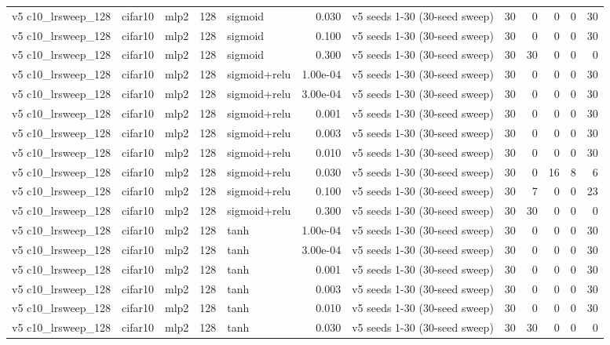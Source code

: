 \begin{table}[htbp]
{\begin{tabular}{@{}lllrlrlrrrrr@{}}
v5 c10\_lrsweep\_128 & cifar10 & mlp2 & 128 & sigmoid & 0.030 & v5 seeds 1-30 (30-seed sweep) & 30 & 0 & 0 & 0 & 30 \\
v5 c10\_lrsweep\_128 & cifar10 & mlp2 & 128 & sigmoid & 0.100 & v5 seeds 1-30 (30-seed sweep) & 30 & 0 & 0 & 0 & 30 \\
v5 c10\_lrsweep\_128 & cifar10 & mlp2 & 128 & sigmoid & 0.300 & v5 seeds 1-30 (30-seed sweep) & 30 & 30 & 0 & 0 & 0 \\
v5 c10\_lrsweep\_128 & cifar10 & mlp2 & 128 & sigmoid+relu & 1.00e-04 & v5 seeds 1-30 (30-seed sweep) & 30 & 0 & 0 & 0 & 30 \\
v5 c10\_lrsweep\_128 & cifar10 & mlp2 & 128 & sigmoid+relu & 3.00e-04 & v5 seeds 1-30 (30-seed sweep) & 30 & 0 & 0 & 0 & 30 \\
v5 c10\_lrsweep\_128 & cifar10 & mlp2 & 128 & sigmoid+relu & 0.001 & v5 seeds 1-30 (30-seed sweep) & 30 & 0 & 0 & 0 & 30 \\
v5 c10\_lrsweep\_128 & cifar10 & mlp2 & 128 & sigmoid+relu & 0.003 & v5 seeds 1-30 (30-seed sweep) & 30 & 0 & 0 & 0 & 30 \\
v5 c10\_lrsweep\_128 & cifar10 & mlp2 & 128 & sigmoid+relu & 0.010 & v5 seeds 1-30 (30-seed sweep) & 30 & 0 & 0 & 0 & 30 \\
v5 c10\_lrsweep\_128 & cifar10 & mlp2 & 128 & sigmoid+relu & 0.030 & v5 seeds 1-30 (30-seed sweep) & 30 & 0 & 16 & 8 & 6 \\
v5 c10\_lrsweep\_128 & cifar10 & mlp2 & 128 & sigmoid+relu & 0.100 & v5 seeds 1-30 (30-seed sweep) & 30 & 7 & 0 & 0 & 23 \\
v5 c10\_lrsweep\_128 & cifar10 & mlp2 & 128 & sigmoid+relu & 0.300 & v5 seeds 1-30 (30-seed sweep) & 30 & 30 & 0 & 0 & 0 \\
v5 c10\_lrsweep\_128 & cifar10 & mlp2 & 128 & tanh & 1.00e-04 & v5 seeds 1-30 (30-seed sweep) & 30 & 0 & 0 & 0 & 30 \\
v5 c10\_lrsweep\_128 & cifar10 & mlp2 & 128 & tanh & 3.00e-04 & v5 seeds 1-30 (30-seed sweep) & 30 & 0 & 0 & 0 & 30 \\
v5 c10\_lrsweep\_128 & cifar10 & mlp2 & 128 & tanh & 0.001 & v5 seeds 1-30 (30-seed sweep) & 30 & 0 & 0 & 0 & 30 \\
v5 c10\_lrsweep\_128 & cifar10 & mlp2 & 128 & tanh & 0.003 & v5 seeds 1-30 (30-seed sweep) & 30 & 0 & 0 & 0 & 30 \\
v5 c10\_lrsweep\_128 & cifar10 & mlp2 & 128 & tanh & 0.010 & v5 seeds 1-30 (30-seed sweep) & 30 & 0 & 0 & 0 & 30 \\
v5 c10\_lrsweep\_128 & cifar10 & mlp2 & 128 & tanh & 0.030 & v5 seeds 1-30 (30-seed sweep) & 30 & 30 & 0 & 0 & 0 \\

\end{tabular}}
\end{table}
